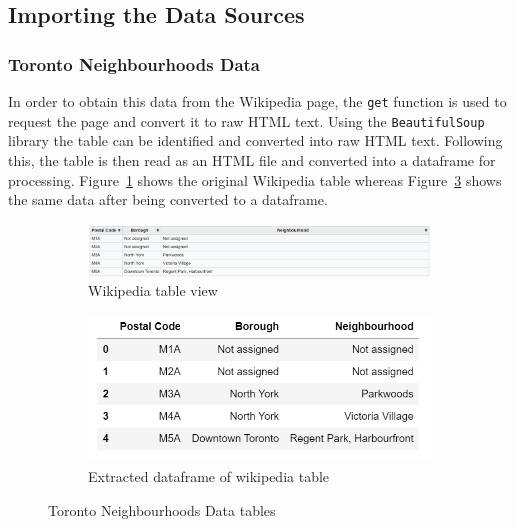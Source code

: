 \documentclass[12pt, conference]{IEEEtran}
\def\code#1{\texttt{#1}}
\begin{document}
\subsection{Importing the Data Sources}

\subsubsection{Toronto Neighbourhoods Data}
In order to obtain this data from the Wikipedia page, the \code{get} function is used to request the page and convert it to raw HTML text. Using the \code{BeautifulSoup} library the table can be identified and converted into raw HTML text. Following this, the table is then read as an HTML file and converted into a dataframe for processing. Figure~\ref{fig: Wiki} shows the original Wikipedia table whereas Figure~\ref{fig: Wikidf} shows the same data after being converted to a dataframe.

\begin{figure}[!h]
     \centering
     \begin{subfigure}[h]{0.45\textwidth}
         \centering
         \includegraphics[width=\textwidth]{WikiTable}
         \caption{Wikipedia table view}
         \label{fig: Wiki}
     \end{subfigure}
     \hfill
     \begin{subfigure}[h]{0.45\textwidth}
         \centering
         \includegraphics[width=\textwidth]{WikiDf}
         \caption{Extracted dataframe of wikipedia table}
         \label{fig: Wikidf}
     \end{subfigure}
     \caption{Toronto Neighbourhoods Data tables}
\end{figure}
\end{document}
